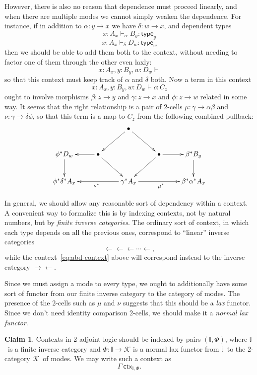 \documentclass{amsart}
\def\type{\mathsf{type}}
\def\K{\ensuremath{\mathcal{K}}}
\def\I{\ensuremath{\mathbb{I}}}
\def\ctx{\:\mathsf{ctx}}
\let\ot\leftarrow
\theoremstyle{definition}
\newtheorem{claim}{Claim}
\begin{document}
However, there is also no reason that dependence must proceed linearly, and when there are multiple modes we cannot simply weaken the dependence.
For instance, if in addition to $\alpha:y\to x$ we have $\delta : w\to x$, and dependent types
\[ x:A_x \vdash_{\alpha} B_y : \type_y \]
\[ x:A_x \vdash_{\delta} D_w : \type_w \]
then we should be able to add them both to the context, without needing to factor one of them through the other even laxly:
\begin{equation}
  x:A_x, y:B_y, w:D_w \vdash\label{eq:abd-context}
\end{equation}
so that this context must keep track of $\alpha$ and $\delta$ both.
Now a term in this context
\[ x:A_x, y:B_y, w:D_w \vdash c:C_z \]
ought to involve morphisms $\beta : z\to y$ and $\gamma : z \to x$ and $\phi : z\to w$ related in some way.
It seems that the right relationship is a pair of 2-cells $\mu: \gamma \to \alpha\beta$ and $\nu: \gamma \to \delta\phi$, so that this term is a map to $C_z$ from the following combined pullback:
\[ \xymatrix{
  && \bullet \ar[dl] \ar[dr] \\
  \phi^* D_w \ar[d] & \bullet \ar[dr] \ar[l] && \bullet\ar[dl] \ar[r] & \beta^* B_y \ar[d] \\
  \phi^* \delta^* A_x && \gamma^*A_x \ar[ll]^{\nu^*} \ar[rr]_{\mu^*} && \beta^* \alpha^* A_x }
\]

In general, we should allow any reasonable sort of dependency within a context.
A convenient way to formalize this is by indexing contexts, not by natural numbers, but by \emph{finite inverse categories}.
The ordinary sort of context, in which each type depends on all the previous ones, correspond to ``linear'' inverse categories
\[\ot\ot\ot\cdots\ot,\]
while the context~\eqref{eq:abd-context} above will correspond instead to the inverse category $\to\ot$.

Since we must assign a mode to every type, we ought to additionally have some sort of functor from our finite inverse category to the category of modes.
The presence of the 2-cells such as $\mu$ and $\nu$ suggests that this should be a \emph{lax} functor.
Since we don't need identity comparison 2-cells, we should make it a \emph{normal lax functor}.

\begin{claim}
  Contexts in 2-adjoint logic should be indexed by pairs $(\I,\Phi)$, where \I\ is a finite inverse category and $\Phi : \I \to \K$ is a normal lax functor from \I\ to the 2-category \K\ of modes.
  We may write such a context as
  \[ \Gamma \ctx_{\I,\Phi}. \]
\end{claim}
\end{document}
